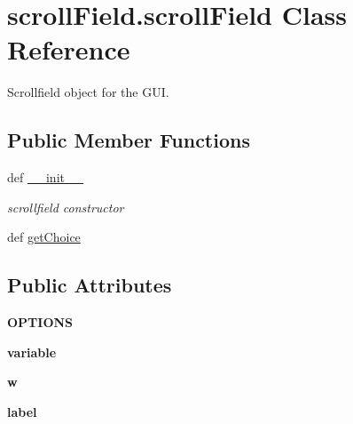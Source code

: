\hypertarget{classscrollField_1_1scrollField}{\section{scroll\+Field.\+scroll\+Field Class Reference}
\label{classscrollField_1_1scrollField}
}


Scrollfield object for the G\+U\+I.  


\subsection*{Public Member Functions}
\begin{DoxyCompactItemize}
\item 
def \hyperlink{classscrollField_1_1scrollField_ae07d6427089fde2891d86ff67eb1cdae}{\+\_\+\+\_\+init\+\_\+\+\_\+}
\begin{DoxyCompactList}\small\item\em scrollfield constructor \end{DoxyCompactList}\item 
def \hyperlink{classscrollField_1_1scrollField_ade80cb73c1b7904838b4f66209c394fd}{get\+Choice}
\end{DoxyCompactItemize}
\subsection*{Public Attributes}
\begin{DoxyCompactItemize}
\item 
\hypertarget{classscrollField_1_1scrollField_a2147f2f7198da88b253c7222da03a6ae}{{\bfseries O\+P\+T\+I\+O\+N\+S}}\label{classscrollField_1_1scrollField_a2147f2f7198da88b253c7222da03a6ae}

\item 
\hypertarget{classscrollField_1_1scrollField_a426b4adaa2711ecfbc6686f9ce08e4ec}{{\bfseries variable}}\label{classscrollField_1_1scrollField_a426b4adaa2711ecfbc6686f9ce08e4ec}

\item 
\hypertarget{classscrollField_1_1scrollField_a62d41efd4e2d4ad7198315416dae324c}{{\bfseries w}}\label{classscrollField_1_1scrollField_a62d41efd4e2d4ad7198315416dae324c}

\item 
\hypertarget{classscrollField_1_1scrollField_a6892d1aecee65721db69fdfa73e388a6}{{\bfseries label}}\label{classscrollField_1_1scrollField_a6892d1aecee65721db69fdfa73e388a6}

\end{DoxyCompactItemize}


